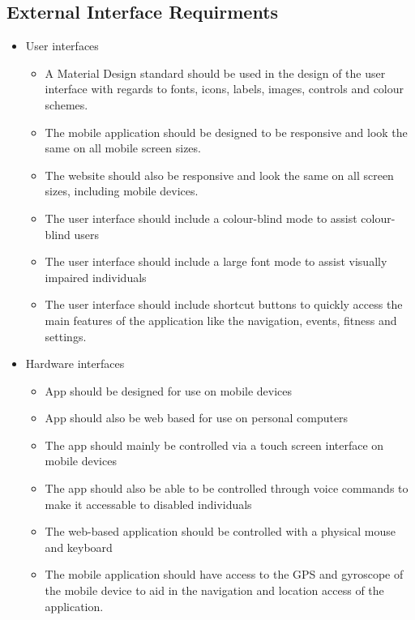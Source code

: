\documentclass{article}
\begin{document}
		\subsection{External Interface Requirments}\label{sec:external-inteface-requirments}
		\begin{itemize}
			\item User interfaces
				\begin{itemize}
					\item A Material Design standard should be used in the design of the user interface with regards to fonts, icons, labels, images, controls and colour schemes.
					\item The mobile application should be designed to be responsive and look the same on all mobile screen sizes.
					\item The website should also be responsive and look the same on all screen sizes, including mobile devices.
					\item The user interface should include a colour-blind mode to assist colour-blind users
					\item The user interface should include a large font mode to assist visually impaired individuals
					\item The user interface should include shortcut buttons to quickly access the main features of the application like the navigation, events, fitness and settings.
				\end{itemize}
				
			\item Hardware interfaces
				\begin{itemize}
					\item App should be designed for use on mobile devices
					\item App should also be web based for use on personal computers
					\item The app should mainly be controlled via a touch screen interface on mobile devices
					\item The app should also be able to be controlled through voice commands to make it accessable to disabled individuals
					\item The web-based application should be controlled with a physical mouse and keyboard
					\item The mobile application should have access to the GPS and gyroscope of the mobile device to aid in the navigation and location access of the application.
				\end{itemize}


\end{itemize}
\end{document}
